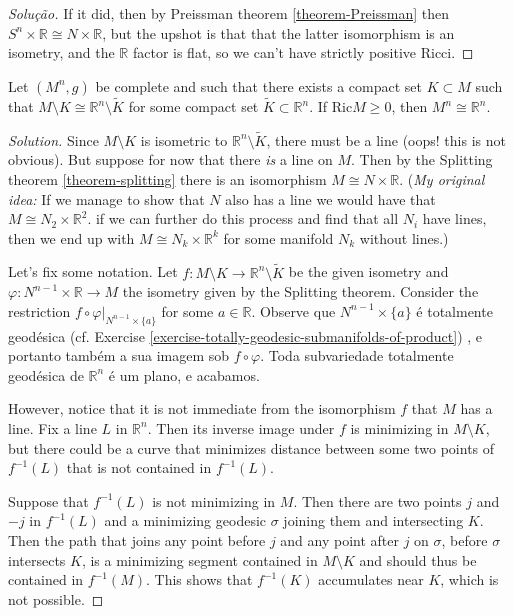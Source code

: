 \begin{proof}[Solução]
If it did, then by Preissman theorem \ref{theorem-Preissman} then $S^n\times
\mathbb{R}\cong N \times \mathbb{R}$, but the upshot is that that the latter 
isomorphism is an isometry, and the $\mathbb{R}$ factor is flat, so we can't 
have strictly positive Ricci.
\end{proof}

\begin{exercise}
\label{exercise-complete-without-a-compact-set-isometric-to-Rn}
Let $(M^n,g)$ be complete and such that there exists a compact set
 $K\subset M$ such that $M\setminus K \cong \mathbb{R}^n \setminus \tilde{K}$
for some compact set $\tilde{K} \subset \mathbb{R}^n$. If $\text{Ric}M \geq 0$,
then $M^n \cong \mathbb{R}^n$.
\end{exercise}

\begin{proof}[Solution]
Since $M\setminus K$ is isometric to $\mathbb{R}^n\setminus \tilde{K}$, there
must be a line (oops! this is not obvious). But suppose for now that there {\it
is} a line on $M$. Then by the Splitting theorem \ref{theorem-splitting} there 
is an isomorphism $M \cong N \times \mathbb{R}$. ({\it My original idea:}
 If we manage to show that $N$ also has a line we would have that
 $M \cong N_2 \times \mathbb{R}^2$.  if we can further do this process and find
 that all $N_i$ have lines,
then we end up with $M \cong N_k \times \mathbb{R}^k$ for some manifold $N_k$
without lines.)

Let's fix some notation. Let 
$f:M\setminus K \to \mathbb{R}^n \setminus\tilde{K}$ be the given isometry and
$\varphi:N^{n-1}\times\mathbb{R} \to M$ the isometry given by the Splitting
theorem. Consider the restriction $f \circ \varphi |_{ N^{n-1}\times \{ a\}}$
for some $a \in \mathbb{R}$. Observe que $N^{n-1}\times \{ a\}$ é totalmente
geodésica (cf. Exercise \ref{exercise-totally-geodesic-submanifolds-of-product})
, e portanto também a sua imagem sob  $f \circ \varphi$. Toda subvariedade
totalmente geodésica de $\mathbb{R}^n$ é um plano, e acabamos.

However, notice that it is not immediate from the
isomorphism $f$ that $M$ has a line. Fix a line $L$ in $\mathbb{R}^n$. Then its
inverse image under $f$ is minimizing in $M \setminus K$, but there could be a
curve that minimizes distance between some two points of $f^{-1}(L)$ that is not
contained in $f^{-1}(L)$.

Suppose that $f^{-1}(L)$ is not minimizing in $M$. Then there are two points $j$
and $-j$ in $f^{-1}(L)$ and a minimizing geodesic $\sigma$ joining them and
intersecting $K$. Then the path that joins any point before $j$ and any point
after $j$ on $\sigma$, before $\sigma$ intersects $K$, is a minimizing segment
contained in $M\setminus K$ and should thus be contained in $f^{-1}(M)$. This
shows that $f^{-1}(K)$ accumulates near $K$, which is not possible.
\end{proof}

